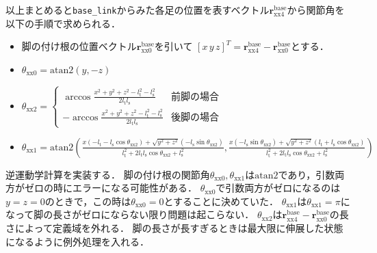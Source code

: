 \documentclass[a4paper]{jlreq}
\begin{document}
  以上まとめると\texttt{base\_link}からみた各足の位置を表すベクトル$\boldsymbol{r}_\mathrm{xx4}^\mathrm{base}$から関節角を以下の手順で求められる．
  \begin{itemize}
    \item 脚の付け根の位置ベクトル$\boldsymbol{r}^\mathrm{base}_\mathrm{xx0}$を引いて
    $[x\, y\, z]^T = \boldsymbol{r}_\mathrm{xx4}^\mathrm{base} - \boldsymbol{r}^\mathrm{base}_\mathrm{xx0}$とする．
    \item $\theta_\mathrm{xx0} = \mathrm{atan2}\left(y, -z\right)$
    \item $\theta_\mathrm{xx2} = \begin{cases}
      \arccos{\frac{x^2 + y^2 + z^2 - l_\mathrm{t}^2 - l_\mathrm{s}^2}{2l_\mathrm{t}l_\mathrm{s}}} & \text{前脚の場合} \\
      -\arccos{\frac{x^2 + y^2 + z^2 - l_\mathrm{t}^2 - l_\mathrm{s}^2}{2l_\mathrm{t}l_\mathrm{s}}} & \text{後脚の場合}
    \end{cases}$
    \item $\theta_\mathrm{xx1} = \mathrm{atan2}\left(
      \frac{x\left(-l_\mathrm{t} - l_\mathrm{s}\cos\theta_\mathrm{xx2}\right) + \sqrt{y^2 + z^2}\left(-l_\mathrm{s}\sin\theta_\mathrm{xx2}\right)}
      {l_\mathrm{t}^2 + 2l_\mathrm{t}l_\mathrm{s}\cos\theta_\mathrm{xx2} + l_\mathrm{s}^2},
      \frac{x\left(-l_\mathrm{s}\sin\theta_\mathrm{xx2}\right) + \sqrt{y^2 + z^2}\left(l_\mathrm{t} + l_\mathrm{s}\cos\theta_\mathrm{xx2}\right)}
      {l_\mathrm{t}^2 + 2l_\mathrm{t}l_\mathrm{s}\cos\theta_\mathrm{xx2} + l_\mathrm{s}^2}
    \right)$
  \end{itemize}

  逆運動学計算を実装する．
  脚の付け根の関節角$\theta_\mathrm{xx0}, \theta_\mathrm{xx1}$は$\mathrm{atan2}$であり，引数両方がゼロの時にエラーになる可能性がある．
  $\theta_\mathrm{xx0}$で引数両方がゼロになるのは$y = z = 0$のときで，この時は$\theta_\mathrm{xx0} = 0$とすることに決めていた．
  $\theta_\mathrm{xx1}$は$\theta_\mathrm{xx1} = \pi$になって脚の長さがゼロにならない限り問題は起こらない．
  $\theta_\mathrm{xx2}$は$\boldsymbol{r}_\mathrm{xx4}^\mathrm{base} - \boldsymbol{r}^\mathrm{base}_\mathrm{xx0}$の長さによって定義域を外れる．
  脚の長さが長すぎるときは最大限に伸展した状態になるように例外処理を入れる．
\end{document}
